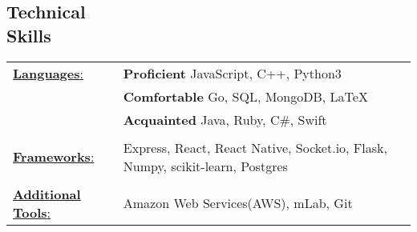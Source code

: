 \documentclass[margin]{res}
\begin{document}
\begin{resume}
 

\section{Technical \\ Skills}
   \begin{tabular}{l p{3in}}
    \underline{{\bf Languages}:} & {\bf Proficient} JavaScript, C++, Python3\\
                           &  {\bf Comfortable} Go, SQL, MongoDB, \LaTeX\\
                           &  {\bf Acquainted} Java, Ruby, C\#, Swift\\ \\
     \underline{{\bf Frameworks}:} &  Express, React, React Native, Socket.io,
                                      Flask, Numpy, scikit-learn, Postgres\\ \\
     \underline{{\bf Additional Tools}:} & Amazon Web Services(AWS), mLab, Git\\
 \end{tabular}

\end{resume} 
\end{document}
